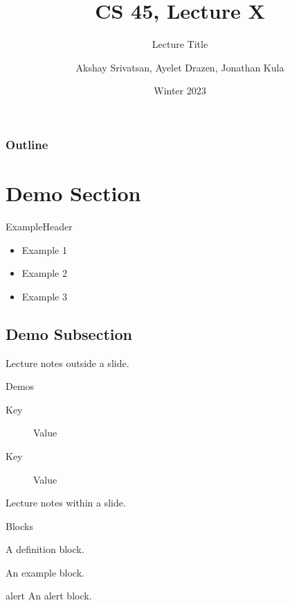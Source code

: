 \usepackage{shared/cs45}

\title{CS 45, Lecture X}
\subtitle{Lecture Title}
\date{Winter 2023}
\author{Akshay Srivatsan, Ayelet Drazen, Jonathan Kula}



\maketitle

\frame{\titlepage}

\begin{frame}
  \frametitle{Outline}
  \tableofcontents[hidesubsections]
\end{frame}

\section{Demo Section}

\begin{frame}{Example}{Header}
  \begin{itemize}
    \item
      Example 1
      \pause
    \item
      Example 2
      \pause
    \item
      Example 3
  \end{itemize}
\end{frame}

\subsection{Demo Subsection}

Lecture notes outside a slide.

\begin{frame}{Demos}
  \begin{description}
    \item[Key]
      Value
    \item[Key]
      Value
  \end{description}
   {
    Lecture notes within a slide.
  }
\end{frame}

\begin{frame}{Blocks}
  \begin{definition}[definition]
    A definition block.
  \end{definition}
  \begin{example}[example]
    An example block.
  \end{example}
  \begin{alertblock}{alert}
    An alert block.
  \end{alertblock}
\end{frame}

